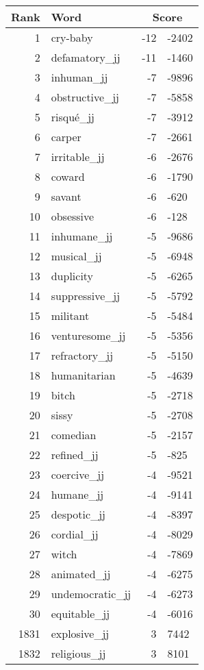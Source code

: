 \begin{longtable}[!htbp]{| rlr@{.}l |}
    \hline
    \textbf{Rank} & \textbf{Word} & \multicolumn{2}{c|}{\textbf{Score}} \\
    \hline
    \endhead
    1 & cry-baby & -12 & -2402 \\
    2 & defamatory\_jj & -11 & -1460 \\
    3 & inhuman\_jj & -7 & -9896 \\
    4 & obstructive\_jj & -7 & -5858 \\
    5 & risqué\_jj & -7 & -3912 \\
    6 & carper & -7 & -2661 \\
    7 & irritable\_jj & -6 & -2676 \\
    8 & coward & -6 & -1790 \\
    9 & savant & -6 & -620 \\
    10 & obsessive & -6 & -128 \\
    11 & inhumane\_jj & -5 & -9686 \\
    12 & musical\_jj & -5 & -6948 \\
    13 & duplicity & -5 & -6265 \\
    14 & suppressive\_jj & -5 & -5792 \\
    15 & militant & -5 & -5484 \\
    16 & venturesome\_jj & -5 & -5356 \\
    17 & refractory\_jj & -5 & -5150 \\
    18 & humanitarian & -5 & -4639 \\
    19 & bitch & -5 & -2718 \\
    20 & sissy & -5 & -2708 \\
    21 & comedian & -5 & -2157 \\
    22 & refined\_jj & -5 & -825 \\
    23 & coercive\_jj & -4 & -9521 \\
    24 & humane\_jj & -4 & -9141 \\
    25 & despotic\_jj & -4 & -8397 \\
    26 & cordial\_jj & -4 & -8029 \\
    27 & witch & -4 & -7869 \\
    28 & animated\_jj & -4 & -6275 \\
    29 & undemocratic\_jj & -4 & -6273 \\
    30 & equitable\_jj & -4 & -6016 \\
    1831 & explosive\_jj & 3 & 7442 \\
    1832 & religious\_jj & 3 & 8101 \\

\end{longtable}
